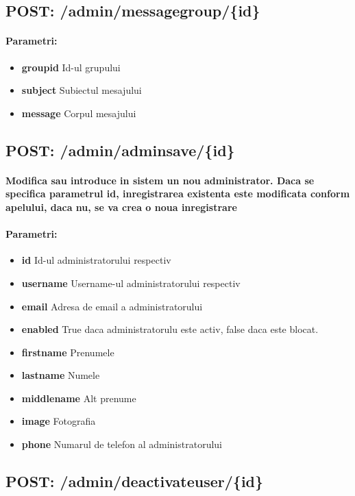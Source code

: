  \subsection*{POST: /admin/messagegroup/\{id\}}

\paragraph{Parametri:}
\begin{itemize}
\item \textbf{groupid}
 Id-ul grupului
\item \textbf{subject}
 Subiectul mesajului 
\item \textbf{message}
 Corpul mesajului
 \end{itemize}
 \subsection*{POST: /admin/adminsave/\{id\}}

\paragraph{Modifica sau introduce in sistem un nou administrator. Daca se specifica parametrul id, inregistrarea existenta este modificata conform apelului, daca nu, se va crea o noua inregistrare}
\paragraph{Parametri:}
\begin{itemize}
\item \textbf{id}
 Id-ul administratorului respectiv
\item \textbf{username}
 Username-ul administratorului respectiv
\item \textbf{email}
 Adresa de email a administratorului
\item \textbf{enabled}
 True daca administratorulu este activ, false daca este blocat. 
\item \textbf{firstname}
 Prenumele
\item \textbf{lastname}
 Numele
\item \textbf{middlename}
 Alt prenume 
\item \textbf{image}
 Fotografia
\item \textbf{phone}
 Numarul de telefon al administratorului
 \end{itemize}
 \subsection*{POST: /admin/deactivateuser/\{id\}}

